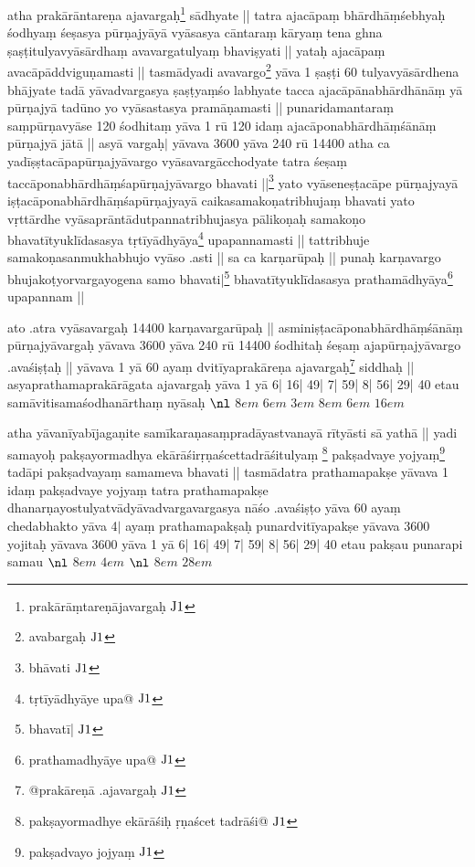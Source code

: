 \documentclass[10pt]{article}
\begin{document}
atha 
prakārāntareṇa ajavargaḥ\footnote{prakārāṃtareṇājavargaḥ ${\rm J1}$}
 sādhyate ||
tatra ajacāpaṃ bhārdhāṃśebhyaḥ śodhyaṃ śeṣasya
pūrṇajyāyā vyāsasya cāntaraṃ kāryaṃ tena ghna ṣaṣṭitulyavyāsārdhaṃ
avavargatulyaṃ bhaviṣyati ||
yataḥ ajacāpaṃ avacāpāddviguṇamasti ||
tasmādyadi avavargo\footnote{avabargaḥ ${\rm J1}$}
yāva 1 ṣaṣṭi 60 tulyavyāsārdhena bhājyate tadā yāvadvargasya
ṣaṣṭyaṃśo labhyate tacca ajacāpānabhārdhānāṃ yā pūrṇajyā
tadūno yo vyāsastasya pramāṇamasti ||
punaridamantaraṃ saṃpūrṇavyāse 120 śodhitaṃ
yāva 1  rū 120
idaṃ ajacāponabhārdhāṃśānāṃ pūrṇajyā jātā ||
asyā vargaḥ\(|\) 
yāvava 3600 yāva 240
rū 14400
atha ca yadīṣṣtacāpapūrṇajyāvargo vyāsavargācchodyate 
tatra śeṣaṃ %
taccāponabhārdhāṃśapūrṇajyāvargo 
bhavati ||\footnote{bhāvati ${\rm J1}$}
yato vyāseneṣṭacāpe pūrṇajyayā iṣṭacāponabhārdhāṃśapūrṇajyayā
caikasamakoṇatribhujaṃ bhavati yato vṛttārdhe vyāsaprāntādutpannatribhujasya
pālikoṇaḥ samakoṇo 
bhavatītyuklīdasasya 
tṛtīyādhyāya\footnote{tṛtīyādhyāye upa@ ${\rm J1}$}
 upapannamasti ||
tattribhuje 
samakoṇasanmukhabhujo vyāso .asti ||
sa ca karṇarūpaḥ ||
punaḥ karṇavargo bhujakoṭyorvargayogena samo 
bhavati|\footnote{bhavatī| ${\rm J1}$}
bhavatītyuklīdasasya 
prathamādhyāya\footnote{prathamadhyāye upa@ ${\rm J1}$}
upapannam ||

ato .atra vyāsavargaḥ 14400 karṇavargarūpaḥ ||
asminiṣṭacāponabhārdhāṃśānāṃ pūrṇajyāvargaḥ
yāvava 3600 yāva 240
rū 14400
śodhitaḥ śeṣaṃ ajapūrṇajyāvargo .avaśiṣṭaḥ ||
yāvava \whitespace\whitespace\whitespace 
{}1  yā 60
ayaṃ 
dvitīyaprakāreṇa ajavargaḥ\footnote{@prakāreṇā .ajavargaḥ ${\rm J1}$}
siddhaḥ ||
asyaprathamaprakārāgata ajavargaḥ yāva 1 yā 6| 16| 49| 7| 59| 8| 56| 29| 40 
etau samāvitisamaśodhanārthaṃ nyāsaḥ
$\nl$
${8em}$
${6em}$
${3em}$
${8em}$
${6em}$
${16em}$

atha yāvanīyabījagaṇite samīkaraṇasaṃpradāyastvanayā rītyāsti
sā yathā ||
yadi samayoḥ pakṣayormadhya ekārāśirṛṇaścettadrāśitulyaṃ
 \footnote{pakṣayormadhye ekārāśiḥ ṛṇaścet tadrāśi@ ${\rm J1}$}
pakṣadvaye yojyaṃ\footnote{pakṣadvayo jojyaṃ ${\rm J1}$}
tadāpi pakṣadvayaṃ samameva bhavati ||
tasmādatra prathamapakṣe yāvava \whitespace\whitespace\whitespace 
{}1  
idaṃ pakṣadvaye yojyaṃ tatra prathamapakṣe 
dhanarṇayostulyatvādyāvadvargavargasya nāśo .avaśiṣṭo
yāva  60
ayaṃ chedabhakto yāva 4\(|\) ayaṃ prathamapakṣaḥ punardvitīyapakṣe
yāvava 3600  yojitaḥ yāvava 3600 
yāva 1 yā 6| 16| 49| 7| 59| 8| 56| 29| 40
etau pakṣau punarapi samau
$\nl$
${8em}$
${4em}$
$\nl$
${8em}$
${28em}$
\end{document}
